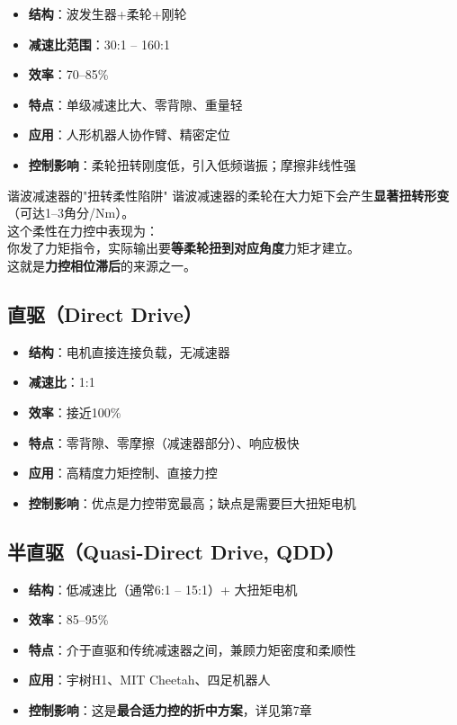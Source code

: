 \begin{itemize}
  \item \textbf{结构}：波发生器+柔轮+刚轮
  \item \textbf{减速比范围}：30:1 -- 160:1
  \item \textbf{效率}：70--85\%
  \item \textbf{特点}：单级减速比大、零背隙、重量轻
  \item \textbf{应用}：人形机器人协作臂、精密定位
  \item \textbf{控制影响}：柔轮扭转刚度低，引入低频谐振；摩擦非线性强
\end{itemize}

\begin{cautionbox}{谐波减速器的"扭转柔性陷阱"}
谐波减速器的柔轮在大力矩下会产生\textbf{显著扭转形变}（可达1--3角分/Nm）。\\
这个柔性在力控中表现为：\\
你发了力矩指令，实际输出要\textbf{等柔轮扭到对应角度}力矩才建立。\\
这就是\textbf{力控相位滞后}的来源之一。
\end{cautionbox}

\subsection{直驱（Direct Drive）}

\begin{itemize}
  \item \textbf{结构}：电机直接连接负载，无减速器
  \item \textbf{减速比}：1:1
  \item \textbf{效率}：接近100\%
  \item \textbf{特点}：零背隙、零摩擦（减速器部分）、响应极快
  \item \textbf{应用}：高精度力矩控制、直接力控
  \item \textbf{控制影响}：优点是力控带宽最高；缺点是需要巨大扭矩电机
\end{itemize}

\subsection{半直驱（Quasi-Direct Drive, QDD）}

\begin{itemize}
  \item \textbf{结构}：低减速比（通常6:1 -- 15:1）+ 大扭矩电机
  \item \textbf{效率}：85--95\%
  \item \textbf{特点}：介于直驱和传统减速器之间，兼顾力矩密度和柔顺性
  \item \textbf{应用}：宇树H1、MIT Cheetah、四足机器人
  \item \textbf{控制影响}：这是\textbf{最合适力控的折中方案}，详见第7章
\end{itemize}

